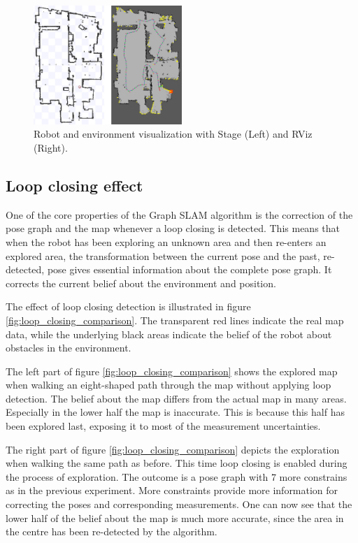 \documentclass{ba-kecs}
\begin{document}
\begin{figure}[htbp]
	\centering
		\includegraphics[width=0.50\textwidth]{figures/Stage_and_rviz.jpg}
	\caption{Robot and environment visualization with Stage (Left) and RViz (Right).}
	\label{fig:stage_and_rviz}
\end{figure}

\subsection{Loop closing effect}
One of the core properties of the Graph SLAM algorithm is the correction of the pose graph and the map whenever a loop closing is detected. This means that when the robot has been exploring an unknown area and then re-enters an explored area, the transformation between the current pose and the past, re-detected, pose gives essential information about the complete pose graph. It corrects the current belief about the environment and position.

The effect of loop closing detection is illustrated in figure \ref{fig:loop_closing_comparison}. The transparent red lines indicate the real map data, while the underlying black areas indicate the belief of the robot about obstacles in the environment.

The left part of figure \ref{fig:loop_closing_comparison} shows the explored map when walking an eight-shaped path through the map without applying loop detection. The belief about the map differs from the actual map in many areas. Especially in the lower half the map is inaccurate. This is because this half has been explored last, exposing it to most of the measurement uncertainties.

The right part of figure \ref{fig:loop_closing_comparison} depicts the exploration when walking the same path as before. This time loop closing is enabled during the process of exploration. The outcome is a pose graph with 7 more constrains as in the previous experiment. More constraints provide more information for correcting the poses and corresponding measurements. One can now see that the lower half of the belief about the map is much more accurate, since the area in the centre has been re-detected by the algorithm.
\end{document}
